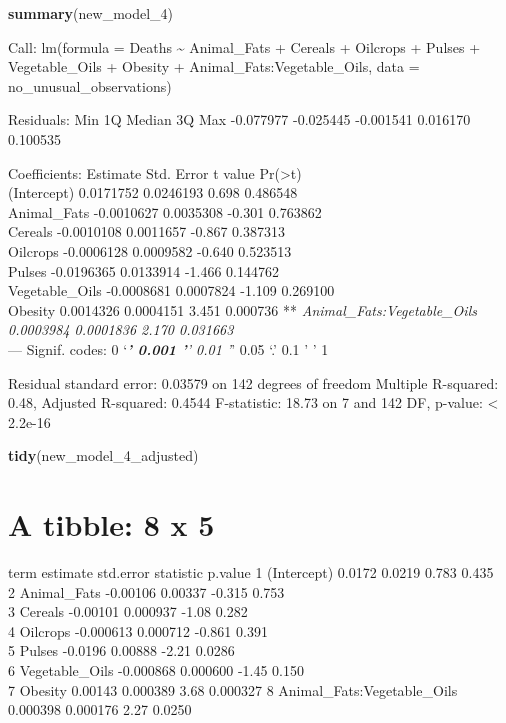 \documentclass[
]{article}
\newenvironment{Shaded}{\begin{snugshade}}{\end{snugshade}}
\newcommand{\DecValTok}[1]{\textcolor[rgb]{0.00,0.00,0.81}{#1}}
\newcommand{\KeywordTok}[1]{\textcolor[rgb]{0.13,0.29,0.53}{\textbf{#1}}}
\newcommand{\NormalTok}[1]{#1}
\begin{document}
\begin{Shaded}
\begin{Highlighting}[]
\KeywordTok{summary}\NormalTok{(new_model_}\DecValTok{4}\NormalTok{)}
\end{Highlighting}
\end{Shaded}

Call: lm(formula = Deaths \textasciitilde{} Animal\_Fats + Cereals +
Oilcrops + Pulses + Vegetable\_Oils + Obesity +
Animal\_Fats:Vegetable\_Oils, data = no\_unusual\_observations)

Residuals: Min 1Q Median 3Q Max -0.077977 -0.025445 -0.001541 0.016170
0.100535

Coefficients: Estimate Std. Error t value
Pr(\textgreater\textbar t\textbar)\\
(Intercept) 0.0171752 0.0246193 0.698 0.486548\\
Animal\_Fats -0.0010627 0.0035308 -0.301 0.763862\\
Cereals -0.0010108 0.0011657 -0.867 0.387313\\
Oilcrops -0.0006128 0.0009582 -0.640 0.523513\\
Pulses -0.0196365 0.0133914 -1.466 0.144762\\
Vegetable\_Oils -0.0008681 0.0007824 -1.109 0.269100\\
Obesity 0.0014326 0.0004151 3.451 0.000736 **\emph{
Animal\_Fats:Vegetable\_Oils 0.0003984 0.0001836 2.170 0.031663 }\\
--- Signif. codes: 0 `\emph{\textbf{' 0.001 '}' 0.01 '}' 0.05 `.' 0.1 '
' 1

Residual standard error: 0.03579 on 142 degrees of freedom Multiple
R-squared: 0.48, Adjusted R-squared: 0.4544 F-statistic: 18.73 on 7 and
142 DF, p-value: \textless{} 2.2e-16

\begin{Shaded}
\begin{Highlighting}[]
\KeywordTok{tidy}\NormalTok{(new_model_}\DecValTok{4}\NormalTok{_adjusted)}
\end{Highlighting}
\end{Shaded}

\hypertarget{a-tibble-8-x-5}{%
\section{A tibble: 8 x 5}\label{a-tibble-8-x-5}}

term estimate std.error statistic p.value 1 (Intercept) 0.0172 0.0219
0.783 0.435\\
2 Animal\_Fats -0.00106 0.00337 -0.315 0.753\\
3 Cereals -0.00101 0.000937 -1.08 0.282\\
4 Oilcrops -0.000613 0.000712 -0.861 0.391\\
5 Pulses -0.0196 0.00888 -2.21 0.0286\\
6 Vegetable\_Oils -0.000868 0.000600 -1.45 0.150\\
7 Obesity 0.00143 0.000389 3.68 0.000327 8 Animal\_Fats:Vegetable\_Oils
0.000398 0.000176 2.27 0.0250
\end{document}
